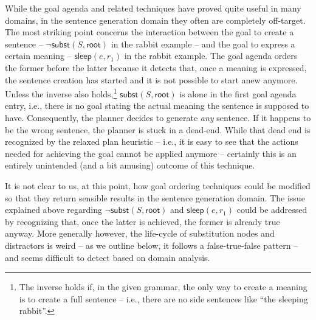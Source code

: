 While the goal agenda and related techniques have proved quite useful
in many domains, in the sentence generation domain they often are
completely off-target. The most striking point concerns the
interaction between the goal to create a sentence -- $\neg
\mathsf{subst}(S,\mathsf{root})$ in the rabbit example -- and the goal
to express a certain meaning -- $\mathsf{sleep}(e,r_1)$ in the
rabbit example. The goal agenda orders the former before the latter
because it detects that, once a meaning is expressed, the sentence
creation has started and it is not possible to start anew
anymore. Unless the inverse also holds,\footnote{The inverse holds if,
  in the given grammar, the only way to create a meaning is to create
  a full sentence -- i.e., there are no side sentences like ``the
  sleeping rabbit''.} $\mathsf{subst}(S,\mathsf{root})$ is alone in
the first goal agenda entry, i.e., there is no goal stating the actual
meaning the sentence is supposed to have. Consequently, the planner
decides to generate {\em any} sentence. If it happens to be the wrong
sentence, the planner is stuck in a dead-end. While that dead end is
recognized by the relaxed plan heuristic -- i.e., it is easy to see
that the actions needed for achieving the goal cannot be applied
anymore -- certainly this is an entirely unintended (and a bit
amusing) outcome of this technique. 


It is not clear to us, at this point, how goal ordering techniques
could be modified so that they return sensible results in the sentence
generation domain. The issue explained above regarding $\neg
\mathsf{subst}(S,\mathsf{root})$ and $\mathsf{sleep}(e,r_1)$ could be
addressed by recognizing that, once the latter is achieved, the former
is already true anyway. More generally however, the life-cycle of
substitution nodes and distractors is weird -- as we outline below, it
follows a false-true-false pattern -- and seems difficult to detect
based on domain analysis.












